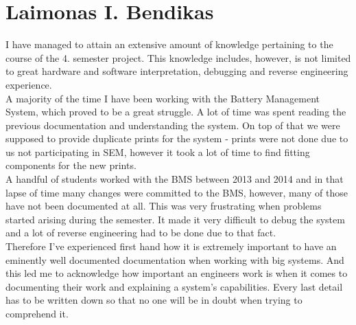 \section{Laimonas I. Bendikas}
I have managed to attain an extensive amount of knowledge pertaining to the course of the 4. semester project. This knowledge includes, however, is not limited to great hardware and software interpretation, debugging and reverse engineering experience.\\
A majority of the time I have been working with the Battery Management System, which proved to be a great struggle. A lot of time was spent reading the previous documentation and understanding the system. On top of that we were supposed to provide duplicate prints for the system - prints were not done due to us not participating in SEM, however it took a lot of time to find fitting components for the new prints.\\
A handful of students worked with the BMS between 2013 and 2014 and in that lapse of time many changes were committed to the BMS, however, many of those have not been documented at all. This was very frustrating when problems started arising during the semester. It made it very difficult to debug the system and a lot of reverse engineering had to be done due to that fact.\\
Therefore I've experienced first hand how it is extremely important to have an eminently well documented documentation when working with big systems. And this led me to acknowledge how important an engineers work is when it comes to documenting their work and explaining a system's capabilities. Every last detail has to be written down so that no one will be in doubt when trying to comprehend it. 